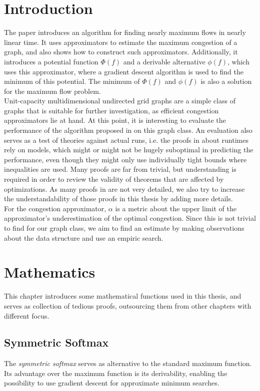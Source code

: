 \chapter{Introduction}
The paper \cite{nmfnlt} introduces an algorithm for finding nearly maximum flows in nearly linear time. It uses approximators to estimate the maximum congestion of a graph, and also shows how to construct such approximators. Additionally, it introduces a potential function $\Phi(f)$ and a derivable alternative $\phi(f)$, which uses this approximator, where a gradient descent algorithm is used to find the minimum of this potential. The minimum of $\Phi(f)$ and $\phi(f)$ is also a solution for the maximum flow problem.\\
Unit-capacity multidimensional undirected grid graphs are a simple class of graphs that is suitable for further investigation, as efficient congestion approximators lie at hand. At this point, it is interesting to evaluate the performance of the algorithm proposed in \cite{nmfnlt} on this graph class. An evaluation also serves as a test of theories against actual runs, i.e. the proofs in \cite{nmfnlt} about runtimes rely on models, which might or might not be hugely suboptimal in predicting the performance, even though they might only use individually tight bounds where inequalities are used. Many proofs are far from trivial, but understanding is required in order to review the validity of theorems that are affected by optimizations. As many proofs in \cite{nmfnlt} are not very detailed, we also try to increase the understandability of those proofs in this thesis by adding more details.\\
For the congestion approximator, $\alpha$ is a metric about the upper limit of the approximator's underestimation of the optimal congestion. Since this is not trivial to find for our graph class, we aim to find an estimate by making observations about the data structure and use an empiric search.
\chapter{Mathematics}
\label{maths}
This chapter introduces some mathematical functions used in this thesis, and serves as collection of tedious proofs, outsourcing them from other chapters with different focus.
\section{Symmetric Softmax}
The \emph{symmetric softmax} serves as alternative to the standard maximum function. Its advantage over the maximum function is its derivability, enabling the possibility to use gradient descent for approximate minimum searches.
